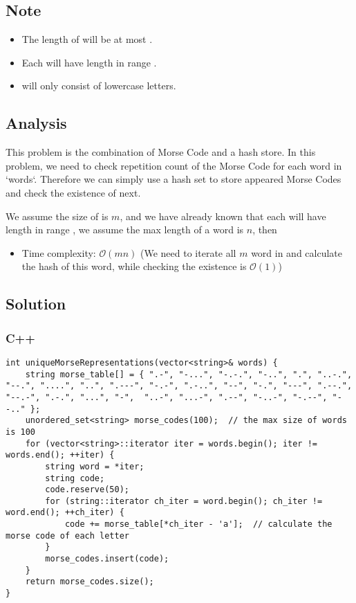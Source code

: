 \subsection*{Note}
\begin{itemize}
    \item The length of  will be at most .
    \item Each  will have length in range \inlinecode{[1, 12]}.
    \item {} will only consist of lowercase letters.
\end{itemize}

\subsection*{Analysis}
This problem is the combination of Morse Code and a hash store. In this problem, we need to check repetition count of the Morse Code for each word in `words`. Therefore we can simply use a hash set to store appeared Morse Codes and check the existence of next.

We assume the size of  is $m$, and we have already known that each  will have length in range \inlinecode{[1, 12]}, we assume the max length of a word is $n$, then
\begin{itemize}
\item Time complexity: $\mathcal{O}(mn)$ (We need to iterate all $m$ word in  and calculate the hash of this word, while checking the existence is $\mathcal{O}(1)$)
\end{itemize}

\subsection*{Solution}
\subsubsection*{C++}
\begin{verbatim}
int uniqueMorseRepresentations(vector<string>& words) {
    string morse_table[] = { ".-", "-...", "-.-.", "-..", ".", "..-.", "--.", "....", "..", ".---", "-.-", ".-..", "--", "-.", "---", ".--.", "--.-", ".-.", "...", "-",  "..-", "...-", ".--", "-..-", "-.--", "--.." };
    unordered_set<string> morse_codes(100);  // the max size of words is 100
    for (vector<string>::iterator iter = words.begin(); iter != words.end(); ++iter) {
        string word = *iter;
        string code;
        code.reserve(50);
        for (string::iterator ch_iter = word.begin(); ch_iter != word.end(); ++ch_iter) {
            code += morse_table[*ch_iter - 'a'];  // calculate the morse code of each letter
        }
        morse_codes.insert(code);
    }
    return morse_codes.size();
}
\end{verbatim}

\newpage

